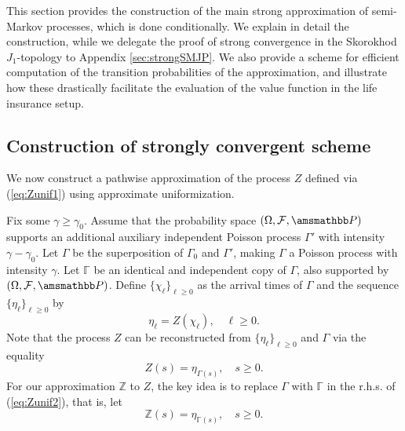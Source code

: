 \documentclass[11pt,leqno]{amsart}
\numberwithin{table}{section}
\numberwithin{figure}{section}
\numberwithin{equation}{section}
\newcommand{\1}{{\mathds{1}}}
\newcommand{\0}{\mat{0}}
\renewcommand{\P }{{\amsmathbb P}}
\newcommand{\ap}[1]{\mathbb{#1}}
\begin{document}
This section provides the construction of the main strong approximation of semi-Markov processes, which is done conditionally. We explain in detail the construction, while we delegate the proof of strong convergence in the Skorokhod $J_1$-topology to Appendix \ref{sec:strongSMJP}. We also provide a scheme for efficient computation of the transition probabilities of the approximation, and illustrate how these drastically facilitate the evaluation of the value function in the life insurance setup.

\subsection{Construction of strongly convergent scheme}\label{sec:approx1}
We now construct a pathwise approximation of the process $Z$ defined via (\ref{eq:Zunif1}) using approximate uniformization.

Fix some $\gamma\ge \gamma_0$. Assume that the probability space $(\Omega, \mathcal{F}, \P)$ supports an additional auxiliary independent Poisson process $\Gamma'$ with intensity $\gamma-\gamma_0$. Let $\Gamma$ be the superposition of $\Gamma_0$ and $\Gamma'$, making $\Gamma$ a Poisson process with intensity $\gamma$. Let $\ap{\Gamma}$ be an identical and independent copy of $\Gamma$, also supported by $(\Omega, \mathcal{F}, \P)$. Define $\{\chi_\ell\}_{\ell\ge 0}$ as the arrival times of $\Gamma$ and the sequence $\{\eta_\ell\}_{\ell\ge 0}$ by
\[\eta_\ell = Z(\chi_\ell),\quad \ell\ge 0.\]
Note that the process $Z$ can be reconstructed from $\{\eta_\ell\}_{\ell\ge 0}$ and $\Gamma$ via the equality
\begin{equation}\label{eq:Zunif2} 
Z(s) = \eta_{\Gamma(s)},\quad s\ge 0.
\end{equation}
For our approximation $\ap{Z}$ to $Z$, the key idea is to replace $\Gamma$ with $\ap{\Gamma}$ in the r.h.s. of (\ref{eq:Zunif2}), that is, let 
\begin{equation}\label{eq:Zdag-unif2} 
\ap{Z}(s) = \eta_{\ap{\Gamma}(s)},\quad s\ge 0.
\end{equation}
\end{document}

